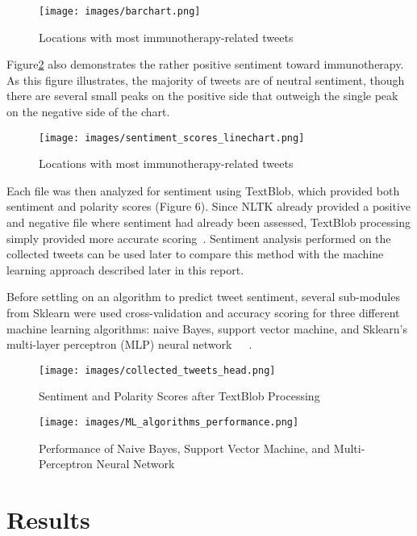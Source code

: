 \begin{figure}[H]
\centering
\texttt{[image: images/barchart.png]}
\caption{Locations with most immunotherapy-related tweets}
\label{fig:barchart}
\end{figure} 

Figure\ref{fig:sentline} also demonstrates the rather positive sentiment toward 
immunotherapy.  As this figure illustrates, the majority of tweets are of neutral 
sentiment, though there are several small peaks on the positive side that outweigh 
the single peak on the negative side of the chart.

\begin{figure}[H]
\centering
\texttt{[image: images/sentiment\_scores\_linechart.png]}
\caption{Locations with most immunotherapy-related tweets}
\label{fig:sentline}
\end{figure} 

Each file was then analyzed for sentiment using TextBlob, which provided both sentiment and
polarity scores (Figure 6).  Since NLTK already provided a positive and negative file where
sentiment had already been assessed, TextBlob processing simply provided more accurate
scoring~\cite{jain2018}.  Sentiment analysis performed on the collected tweets can be 
used later to compare this method with the machine learning approach described later in this report.  

Before settling on an algorithm to predict tweet sentiment, several sub-modules from Sklearn were
used cross-validation and accuracy scoring for three different machine learning algorithms:
naive Bayes, support vector machine, and Sklearn's multi-layer perceptron (MLP) 
neural network~\cite{brownlee_2016}~\cite{ads_algorithms}~\cite{raschka2016}.

\begin{figure}[H]
\centering
\texttt{[image: images/collected\_tweets\_head.png]}
\caption{Sentiment and Polarity Scores after TextBlob Processing}
\label{fig:scores_textblob}
\end{figure} 

\begin{figure}[H]
\centering
\texttt{[image: images/ML\_algorithms\_performance.png]}
\caption{Performance of Naive Bayes, Support Vector Machine, and Multi-Perceptron 
Neural Network}
\label{fig:performance_scores}
\end{figure} 

\section{Results}

